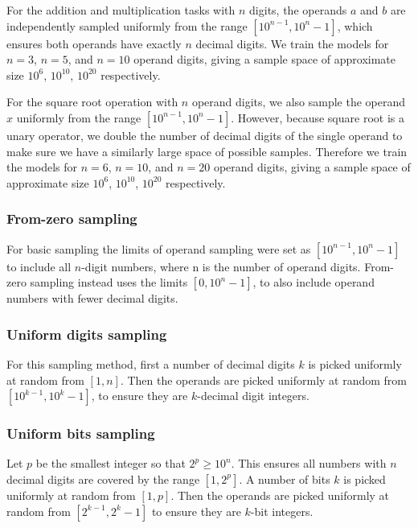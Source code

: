 For the addition and multiplication tasks with $n$ digits, the operands $a$ and $b$ are independently sampled uniformly from the range $[{10}^{n-1}, 10^n - 1]$, which ensures both operands have exactly $n$ decimal digits. We train the models for $n=3$, $n=5$,  and $n=10$ operand digits, giving a sample space of approximate size $10^6$, $10^{10}$, $10^{20}$ respectively.

For the square root operation with $n$ operand digits, we also sample the operand $x$ uniformly from the range $[{10}^{n-1}, 10^n - 1]$. However, because square root is a unary operator, we double the number of decimal digits of the single operand to make sure we have a similarly large space of possible samples. Therefore we train the models for $n=6$, $n=10$,  and $n=20$ operand digits, giving a sample space of approximate size $10^6$, $10^{10}$, $10^{20}$ respectively.

\subsubsection{From-zero sampling}
\label{methods:sampling:fromzero}

For basic sampling the limits of operand sampling were set as $[10^{n-1}, 10^n - 1]$ to include all $n$-digit numbers, where n is the number of operand digits. From-zero sampling instead uses the limits $[0, 10^n - 1]$, to also include operand numbers with fewer decimal digits.

\subsubsection{Uniform digits sampling}
\label{methods:sampling:digits}

For this sampling method, first a number of decimal digits $k$ is picked uniformly at random from $[1, n]$. Then the operands are picked uniformly at random from $[10^{k-1}, 10^k - 1]$, to ensure they are $k$-decimal digit integers.

\subsubsection{Uniform bits sampling}
\label{methods:sampling:bits}

Let $p$ be the smallest integer so that $2^p \geq {10}^n$. This ensures all numbers with $n$ decimal digits are covered by the range $[1, 2^p]$.
A number of bits $k$ is picked uniformly at random from $[1, p]$. Then the operands are picked uniformly at random from $[2^{k-1}, 2^k - 1]$ to ensure they are $k$-bit integers.




